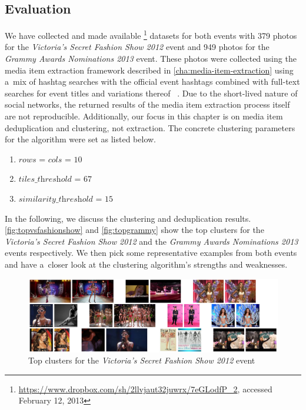 \subsection{Evaluation}\label{sec:evaluation-chpater6}

We have collected and made available%
\footnote{\url{https://www.dropbox.com/sh/2llvjaut32juwrx/7eGLodfP_2},
accessed February 12, 2013}
datasets for both events with
379 photos for the \emph{Victoria's Secret Fashion Show 2012} event 
and 949 photos for the \emph{Grammy Awards Nominations 2013} event.
These photos were collected using the media item extraction framework
described in \autoref{cha:media-item-extraction}
using a~mix of hashtag searches with the official event hashtags combined
with full-text searches for event titles and variations thereof~%
\cite{becker2010eventidentification,becker2012plannedevents}.
Due to the short-lived nature of social networks,
the returned results of the media item extraction process itself
are not reproducible.
Additionally, our focus in this chapter
is on media item deduplication and clustering, not extraction.
The concrete clustering parameters for the algorithm were set as listed below.

\begin{enumerate}
  \item $\textit{rows}$ = $\textit{cols}$ = $10$
  \item $\textit{tiles\_threshold}$ = $67$
  \item $\textit{similarity\_threshold}$ = $15$
\end{enumerate}

In the following, we discuss the clustering and deduplication results.
\autoref{fig:topvsfashionshow} and \autoref{fig:topgrammy} show the top clusters
for the \emph{Victoria's Secret Fashion Show 2012} and the 
\emph{Grammy Awards Nominations 2013} events respectively.
We then pick some representative examples from both events
and have a~closer look at the clustering algorithm's strengths and weaknesses.

\begin{figure}[!ht]
  \centering
  \includegraphics[width=1.0\linewidth]{./vsfashionshow_clusters.png}
  \caption{Top clusters for the \emph{Victoria's Secret Fashion Show 2012} event}
  \label{fig:topvsfashionshow}
\end{figure}

